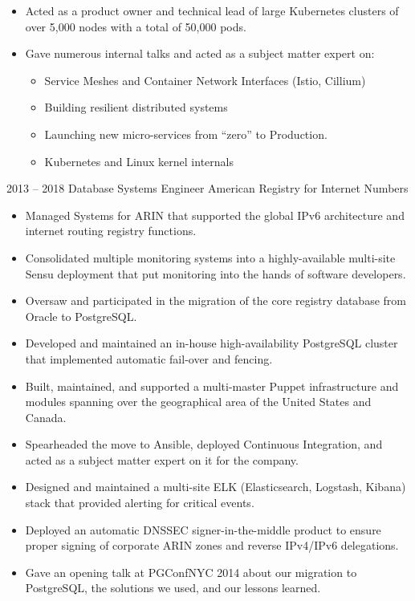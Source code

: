 \documentclass[9pt]{developercv}
\begin{document}
\begin{entrylist}
{\begin{itemize}
\begin{itemize}
				  \end{itemize}
			\item Acted as a product owner and technical lead of large Kubernetes clusters of over 5,000 nodes with a total of 50,000 pods.
			\item Gave numerous internal talks and acted as a subject matter expert on:
				  \begin{itemize}
					\item Service Meshes and Container Network Interfaces (Istio, Cillium)
					\item Building resilient distributed systems
					\item Launching new micro-services from ``zero'' to Production.
					\item Kubernetes and Linux kernel internals
				  \end{itemize}
		  \end{itemize}
		}
	\entry
		{2013 -- 2018}
		{Database Systems Engineer}
		{American Registry for Internet Numbers}
		{
		  \begin{itemize}
			\item Managed Systems for ARIN that supported the global IPv6 architecture and internet routing registry functions.
			\item Consolidated multiple monitoring systems into a highly-available multi-site Sensu deployment that put monitoring into the hands of software developers.
			\item Oversaw and participated in the migration of the core registry database from Oracle to PostgreSQL.
			\item Developed and maintained an in-house high-availability PostgreSQL cluster that implemented automatic fail-over and fencing.
			\item Built, maintained, and supported a multi-master Puppet infrastructure and modules spanning over the geographical area of the United States and Canada.
			\item Spearheaded the move to Ansible, deployed Continuous Integration, and acted as a subject matter expert on it for the company.
			\item Designed and maintained a multi-site ELK (Elasticsearch, Logstash, Kibana) stack that provided alerting for critical events.
			\item Deployed an automatic DNSSEC signer-in-the-middle product to ensure proper signing of corporate ARIN zones and reverse IPv4/IPv6 delegations.
			\item Gave an opening talk at PGConfNYC 2014 about our migration to PostgreSQL, the solutions we used, and our lessons learned.

\end{itemize}}
\end{entrylist}
\end{document}
